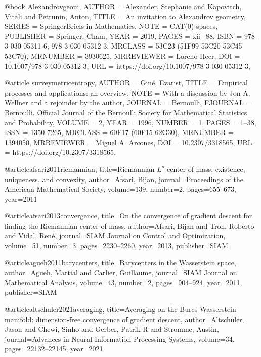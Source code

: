 @book {Alexandrovgeom,
    AUTHOR = {Alexander, Stephanie and Kapovitch, Vitali and Petrunin,
              Anton},
     TITLE = {An invitation to {A}lexandrov geometry},
    SERIES = {SpringerBriefs in Mathematics},
      NOTE = {CAT(0) spaces},
 PUBLISHER = {Springer, Cham},
      YEAR = {2019},
     PAGES = {xii+88},
      ISBN = {978-3-030-05311-6; 978-3-030-05312-3},
   MRCLASS = {53C23 (51F99 53C20 53C45 53C70)},
  MRNUMBER = {3930625},
MRREVIEWER = {Loreno Heer},
       DOI = {10.1007/978-3-030-05312-3},
       URL = {https://doi.org/10.1007/978-3-030-05312-3},
}

@article {surveymetricentropy,
    AUTHOR = {Gin\'{e}, Evarist},
     TITLE = {Empirical processes and applications: an overview},
      NOTE = {With a discussion by Jon A. Wellner and a rejoinder by the
              author},
   JOURNAL = {Bernoulli},
  FJOURNAL = {Bernoulli. Official Journal of the Bernoulli Society for
              Mathematical Statistics and Probability},
    VOLUME = {2},
      YEAR = {1996},
    NUMBER = {1},
     PAGES = {1--38},
      ISSN = {1350-7265},
   MRCLASS = {60F17 (60F15 62G30)},
  MRNUMBER = {1394050},
MRREVIEWER = {Miguel A. Arcones},
       DOI = {10.2307/3318565},
       URL = {https://doi.org/10.2307/3318565},
}

@article{afsari2011riemannian,
  title={Riemannian $L^p$-center of mass: existence, uniqueness, and convexity},
  author={Afsari, Bijan},
  journal={Proceedings of the American Mathematical Society},
  volume={139},
  number={2},
  pages={655--673},
  year={2011}
}


@article{afsari2013convergence,
  title={On the convergence of gradient descent for finding the Riemannian center of mass},
  author={Afsari, Bijan and Tron, Roberto and Vidal, Ren{\'e}},
  journal={SIAM Journal on Control and Optimization},
  volume={51},
  number={3},
  pages={2230--2260},
  year={2013},
  publisher={SIAM}
}

@article{agueh2011barycenters,
  title={Barycenters in the Wasserstein space},
  author={Agueh, Martial and Carlier, Guillaume},
  journal={SIAM Journal on Mathematical Analysis},
  volume={43},
  number={2},
  pages={904--924},
  year={2011},
  publisher={SIAM}
}


@article{altschuler2021averaging,
  title={Averaging on the Bures-Wasserstein manifold: dimension-free convergence of gradient descent},
  author={Altschuler, Jason and Chewi, Sinho and Gerber, Patrik R and Stromme, Austin},
  journal={Advances in Neural Information Processing Systems},
  volume={34},
  pages={22132--22145},
  year={2021}
}


